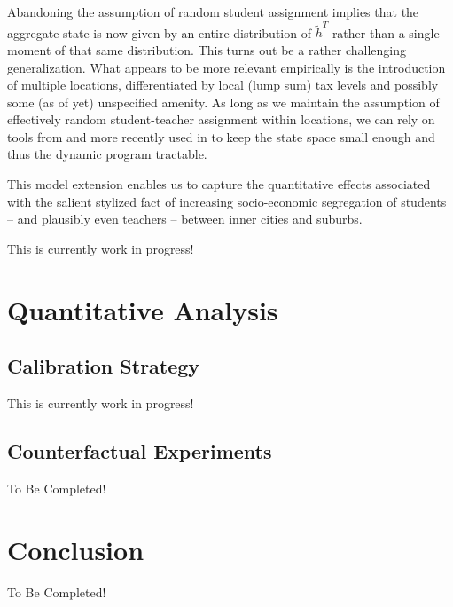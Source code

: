 \documentclass[onehalfspacing,11pt]{article}
\begin{document}
Abandoning the assumption of random student assignment implies that the aggregate state is now given by an entire distribution of $\widetilde{h}^{T}$ rather than a single moment of that same distribution. This turns out be a rather challenging generalization. What appears to be more relevant empirically is the introduction of multiple locations, differentiated by local (lump sum) tax levels and possibly some (as of yet) unspecified amenity. As long as we maintain the assumption of effectively random student-teacher assignment within locations, we can rely on tools from \cite{Lucas:2014} and more recently used in \cite{Martellini:2019} to keep the state space small enough and thus the dynamic program tractable.

This model extension enables us to capture the quantitative effects associated with the salient stylized fact of increasing socio-economic segregation of students -- and plausibly even teachers -- between inner cities and suburbs.

{\sc This is currently work in progress!}
\section{Quantitative Analysis}\label{sec:quant}
\subsection{Calibration Strategy}
{\sc This is currently work in progress!}
\subsection{Counterfactual Experiments}
{\sc To Be Completed!}
\section{Conclusion}\label{sec:conclusion}
{\sc To Be Completed!}
\newpage


\end{document}
